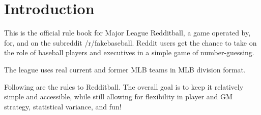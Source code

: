 
\section*{Introduction}
\label{sec:intro}

This is the official rule book for Major League Redditball, 
a game operated by, for, and on the subreddit /r/fakebaseball. 
Reddit users get the chance to take on the role of baseball players 
and executives in a simple game of number-guessing.

The league uses real current and former MLB teams in MLB division format.

Following are the rules to Redditball. 
The overall goal is to keep it relatively simple and accessible, 
while still allowing for flexibility in player and GM strategy, 
statistical variance, and fun!